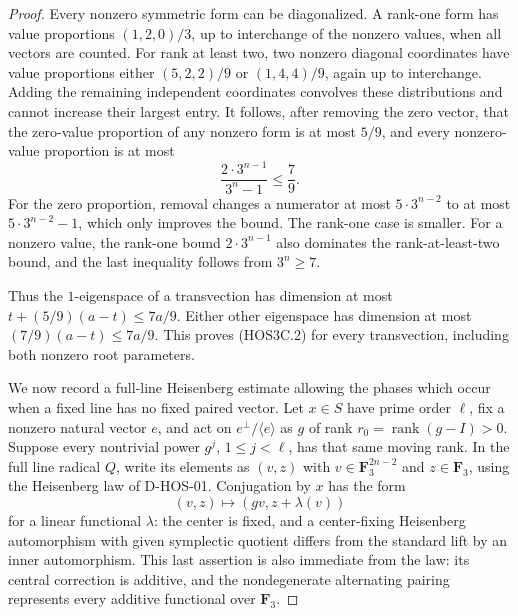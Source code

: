 \begin{proof}
Every nonzero symmetric form can be diagonalized. A rank-one form
has value proportions $(1,2,0)/3$, up to interchange of the nonzero
values, when all vectors are counted. For rank at least two, two
nonzero diagonal coordinates have value proportions either
$(5,2,2)/9$ or $(1,4,4)/9$, again up to interchange. Adding the
remaining independent coordinates convolves these distributions
and cannot increase their largest entry. It follows, after removing
the zero vector, that the zero-value proportion of any nonzero form
is at most $5/9$, and every nonzero-value proportion is at most
\[
                 \frac{2\cdot3^{n-1}}{3^n-1}\le\frac79.
 \tag{HOS3C.5}
\]
For the zero proportion, removal changes a numerator at most
$5\cdot3^{n-2}$ to at most $5\cdot3^{n-2}-1$, which only improves
the bound. The rank-one case is smaller. For a nonzero value,
the rank-one bound $2\cdot3^{n-1}$ also dominates the rank-at-least-two
bound, and the last inequality follows from $3^n\ge7$.

Thus the $1$-eigenspace of a transvection has dimension at most
$t+(5/9)(a-t)\le7a/9$. Either other eigenspace has dimension at
most $(7/9)(a-t)\le7a/9$. This proves (HOS3C.2) for every
transvection, including both nonzero root parameters.

We now record a full-line Heisenberg estimate allowing the phases
which occur when a fixed line has no fixed paired vector. Let $x\in S$
have prime order $\ell$, fix a nonzero natural vector $e$, and act
on $e^\perp/\langle e\rangle$ as $g$ of rank
$r_0=\operatorname{rank}(g-I)>0$. Suppose every nontrivial power
$g^j$, $1\le j<\ell$, has that same moving rank. In the full line
radical $Q$, write its elements as $(v,z)$ with
$v\in\mathbf F_3^{2n-2}$ and $z\in\mathbf F_3$, using the
Heisenberg law of D-HOS-01. Conjugation by $x$ has the form
\[
                   (v,z)\longmapsto(gv,z+\lambda(v))
 \tag{HOS3C.6}
\]
for a linear functional $\lambda$: the center is fixed, and a
center-fixing Heisenberg automorphism with given symplectic quotient
differs from the standard lift by an inner automorphism.
This last assertion is also immediate from the law: its central
correction is additive, and the nondegenerate alternating pairing
represents every additive functional over $\mathbf F_3$.


\end{proof}
